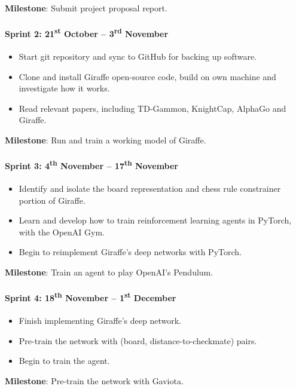 \documentclass[12pt,a4paper]{book}
\begin{document}
\textbf{Milestone}: Submit project proposal report.

\paragraph{Sprint 2: 21\textsuperscript{st} October -- 3\textsuperscript{rd} November}
\begin{itemize}
\item Start git repository and sync to GitHub for backing up software.
\item Clone and install Giraffe open-source code, build on own machine and investigate how it works.
\item Read relevant papers, including TD-Gammon, KnightCap, AlphaGo and Giraffe. 
\end{itemize}

\textbf{Milestone}: Run and train a working model of Giraffe.

\paragraph{Sprint 3: 4\textsuperscript{th} November -- 17\textsuperscript{th} November}
\begin{itemize}
\item Identify and isolate the board representation and chess rule constrainer portion of Giraffe.
\item Learn and develop how to train reinforcement learning agents in PyTorch, with the OpenAI Gym.
\item Begin to reimplement Giraffe's deep networks with PyTorch.
\end{itemize}

\textbf{Milestone}: Train an agent to play OpenAI's Pendulum.

\paragraph{Sprint 4: 18\textsuperscript{th} November -- 1\textsuperscript{st} December}
\begin{itemize}
\item Finish implementing Giraffe's deep network.
\item Pre-train the network with (board, distance-to-checkmate) pairs.
\item Begin to train the agent.
\end{itemize}

\textbf{Milestone}: Pre-train the network with Gaviota.
\end{document}
